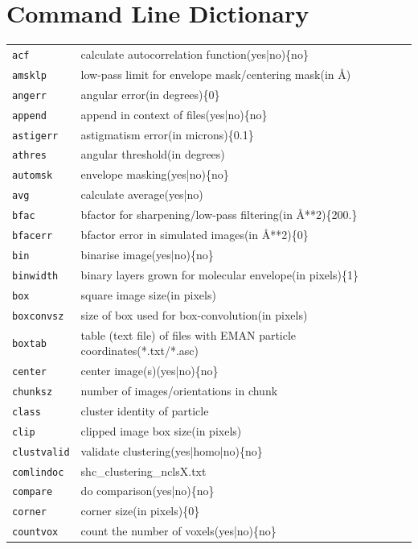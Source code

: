 \documentclass[a4paper,11pt]{article}
\begin{document}
\section{Command Line Dictionary}
\begin{tabular}{ll}
\texttt{acf}&{calculate autocorrelation function(yes|no)\{no\}}\\
\texttt{amsklp}&{low-pass limit for envelope mask/centering mask(in \AA{})}\\
\texttt{angerr}&{angular error(in degrees)\{0\}}\\
\texttt{append}&{append in context of files(yes|no)\{no\}}\\
\texttt{astigerr}&{astigmatism error(in microns)\{0.1\}}\\
\texttt{athres}&{angular threshold(in degrees)}\\
\texttt{automsk}&{envelope masking(yes|no)\{no\}}\\
\texttt{avg}&{calculate average(yes|no)}\\
\texttt{bfac}&{bfactor for sharpening/low-pass filtering(in \AA{}**2)\{200.\}}\\
\texttt{bfacerr}&{bfactor error in simulated images(in \AA{}**2)\{0\}}\\
\texttt{bin}&{binarise image(yes|no)\{no\}}\\
\texttt{binwidth}&{binary layers grown for molecular envelope(in pixels)\{1\}}\\
\texttt{box}&{square image size(in pixels)}\\
\texttt{boxconvsz}&{size of box used for box-convolution(in pixels)}\\
\texttt{boxtab}&{table (text file) of files with EMAN particle coordinates(*.txt/*.asc)}\\
\texttt{center}&{center image(s)(yes|no)\{no\}}\\
\texttt{chunksz}&{number of images/orientations in chunk}\\
\texttt{class}&{cluster identity of particle}\\
\texttt{clip}&{clipped image box size(in pixels)}\\
\texttt{clustvalid}&{validate clustering(yes|homo|no)\{no\}}\\
\texttt{comlindoc}&{shc\_clustering\_nclsX.txt}\\
\texttt{compare}&{do comparison(yes|no)\{no\}}\\
\texttt{corner}&{corner size(in pixels)\{0\}}\\
\texttt{countvox}&{count the number of voxels(yes|no)\{no\}}\\

\end{tabular}
\end{document}
